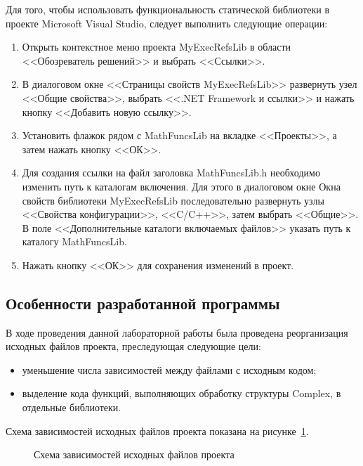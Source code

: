 Для того, чтобы использовать функциональность статической библиотеки в проекте
Microsoft Visual Studio, следует выполнить следующие операции:

\begin{enumerate}
\item
  Открыть контекстное меню проекта MyExecRefsLib в области
  <<Обозреватель решений>> и выбрать <<Ссылки>>.
\item
  В диалоговом окне <<Страницы свойств MyExecRefsLib>> развернуть узел <<Общие свойства>>,
  выбрать <<.NET Framework и ссылки>> и нажать кнопку <<Добавить новую ссылку>>.
\item
  Установить флажок рядом с MathFuncsLib на вкладке <<Проекты>>,
  а затем нажать кнопку <<ОК>>.
\item
  Для создания ссылки на файл заголовка MathFuncsLib.h необходимо изменить путь
  к каталогам включения.
  Для этого в диалоговом окне Окна свойств библиотеки MyExecRefsLib последовательно
  развернуть узлы <<Свойства конфигурации>>, <<C/C++>>, затем выбрать <<Общие>>.
  В поле <<Дополнительные каталоги включаемых файлов>> указать путь к каталогу
  MathFuncsLib.
\item
  Нажать кнопку <<ОК>> для сохранения изменений в проект.
\end{enumerate}

\pagebreak 

\subsection{Особенности разработанной программы}

В ходе проведения данной лабораторной работы была проведена реорганизация 
исходных файлов проекта, преследующая следующие цели:

\begin{itemize}
\item уменьшение числа зависимостей между файлами с исходным кодом;
\item выделение кода функций, выполняющих обработку структуры Complex, 
  в отдельные библиотеки.
\end{itemize}

Схема зависимостей исходных файлов проекта показана на рисунке~\ref{fig:dependencies}.

\begin{figure}[htbp]
  \centering
  \small{
    
  }
  \caption{Схема зависимостей исходных файлов проекта}\label{fig:dependencies}
\end{figure}

